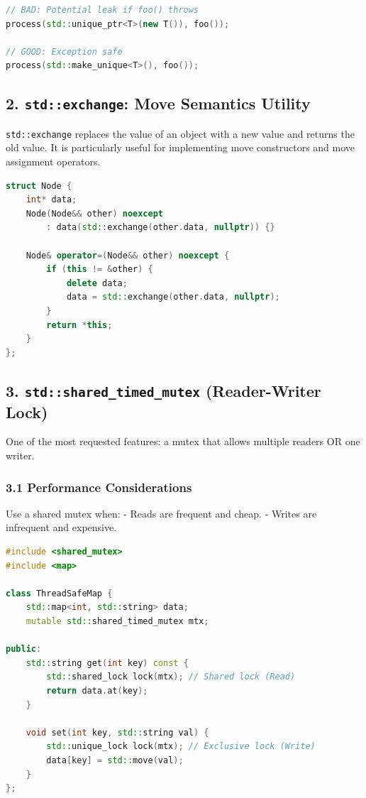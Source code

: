 \begin{lstlisting}[language={C++}]
// BAD: Potential leak if foo() throws
process(std::unique_ptr<T>(new T()), foo());

// GOOD: Exception safe
process(std::make_unique<T>(), foo());
\end{lstlisting}

\hypertarget{stdexchange-move-semantics-utility}{%
\subsection{\texorpdfstring{2. \texttt{std::exchange}: Move Semantics
Utility}{2. std::exchange: Move Semantics Utility}}\label{stdexchange-move-semantics-utility}}

\passthrough{\lstinline!std::exchange!} replaces the value of an object
with a new value and returns the old value. It is particularly useful
for implementing move constructors and move assignment operators.

\begin{lstlisting}[language={C++}]
struct Node {
    int* data;
    Node(Node&& other) noexcept
        : data(std::exchange(other.data, nullptr)) {}

    Node& operator=(Node&& other) noexcept {
        if (this != &other) {
            delete data;
            data = std::exchange(other.data, nullptr);
        }
        return *this;
    }
};
\end{lstlisting}

\hypertarget{stdshared_timed_mutex-reader-writer-lock}{%
\subsection{\texorpdfstring{3. \texttt{std::shared\_timed\_mutex}
(Reader-Writer
Lock)}{3. std::shared\_timed\_mutex (Reader-Writer Lock)}}\label{stdshared_timed_mutex-reader-writer-lock}}

One of the most requested features: a mutex that allows multiple readers
OR one writer.

\hypertarget{performance-considerations}{%
\subsubsection{3.1 Performance
Considerations}\label{performance-considerations}}

Use a shared mutex when: - Reads are frequent and cheap. - Writes are
infrequent and expensive.

\begin{lstlisting}[language={C++}]
#include <shared_mutex>
#include <map>

class ThreadSafeMap {
    std::map<int, std::string> data;
    mutable std::shared_timed_mutex mtx;

public:
    std::string get(int key) const {
        std::shared_lock lock(mtx); // Shared lock (Read)
        return data.at(key);
    }

    void set(int key, std::string val) {
        std::unique_lock lock(mtx); // Exclusive lock (Write)
        data[key] = std::move(val);
    }
};
\end{lstlisting}

